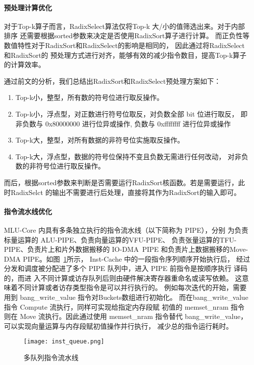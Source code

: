 \paragraph{预处理计算优化}
    对于Top-k算子而言，RadixSelect算法仅将Top-k 大/小的值筛选出来。对于内部排序
    还需要根据sorted参数来决定是否使用RadixSort算子进行计算。
    而正负性等数值特性对于RadixSort和RadixSelect的影响是相同的，
    因此通过将RadixSelect和RadixSort的
    预处理方式进行对齐，能够有效的减少指令数目，提高Top-k算子的计算效率。

    通过前文的分析，我们总结出RadixSort和RadixSelect预处理方案如下：
    \begin{enumerate}
        \item Top-k小，整型，所有数的符号位进行取反操作。
        \item Top-k小，浮点型，对正数进行符号位取反，对负数全部 bit 位进行取反，
        即非负数与 0x80000000 进行位异或操作, 负数与 0xffffffff 进行位异或操作
        \item Top-k大，整型，对所有数据的非符号位实施取反操作。
        \item Top-k大，浮点型，数据的符号位保持不变且负数无需进行任何改动，
        对非负数的非符号位进行取反操作。
    \end{enumerate}

    而后，根据sorted参数来判断是否需要运行RadixSort核函数。若是需要运行，此时RadixSelct
    的输出不需要进行后处理，直接将其作为RadixSort的输入即可。



\paragraph{指令流水线优化}
MLU-Core 内具有多条独立执行的指令流水线（以下简称为 PIPE），分别 为负责标量运算的 ALU-PIPE、负责向量运算的VFU-PIPE、
负责张量运算的TFU-PIPE、负责片上和片外数据搬移的 IO-DMA\ PIPE 和负责片上数据搬移的Move-DMA PIPE。如图~\ref{fig:inst_queue}所示，
Inst-Cache 中的一段指令序列顺序开始执行后， 经过分发和调度被分配进了多个 PIPE 队列中，进入 PIPE 前指令是按顺序执行 译码的，而进
入不同计算或访存队列后则由硬件解决寄存器重命名或读写依赖。 这意味着不同计算或者访存类型指令是可以并行执行的。
例如每次迭代的开始，需要用到 bang\_write\_value 指令对Buckets数组进行初始化。
而在bang\_write\_value指令 Compute 流执行，同样可实现给指定内存段赋 初值的
 memset\_nram 指令则在 Move 流执行。因此通过使用 memset\_nram 指令替代
 bang\_write\_value，可以实现向量运算与内存段赋初值操作并行执行，
 减少总的指令运行耗时。
\begin{figure}[ht]
    \centering
    \texttt{[image: inst\_queue.png]}
    \caption{多队列指令流水线}
    \label{fig:inst_queue}
\end{figure}

